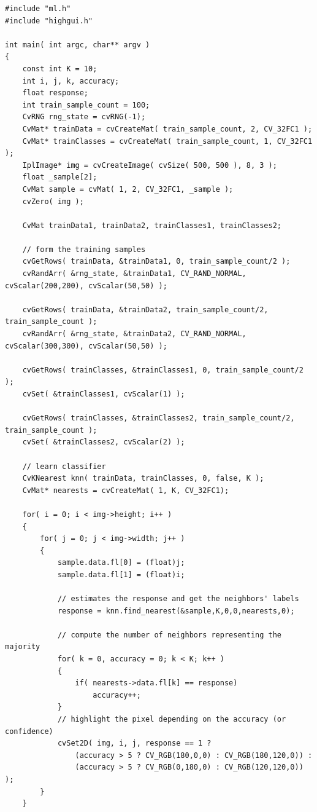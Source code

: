 \begin{lstlisting}
#include "ml.h"
#include "highgui.h"

int main( int argc, char** argv )
{
    const int K = 10;
    int i, j, k, accuracy;
    float response;
    int train_sample_count = 100;
    CvRNG rng_state = cvRNG(-1);
    CvMat* trainData = cvCreateMat( train_sample_count, 2, CV_32FC1 );
    CvMat* trainClasses = cvCreateMat( train_sample_count, 1, CV_32FC1 );
    IplImage* img = cvCreateImage( cvSize( 500, 500 ), 8, 3 );
    float _sample[2];
    CvMat sample = cvMat( 1, 2, CV_32FC1, _sample );
    cvZero( img );

    CvMat trainData1, trainData2, trainClasses1, trainClasses2;

    // form the training samples
    cvGetRows( trainData, &trainData1, 0, train_sample_count/2 );
    cvRandArr( &rng_state, &trainData1, CV_RAND_NORMAL, cvScalar(200,200), cvScalar(50,50) );

    cvGetRows( trainData, &trainData2, train_sample_count/2, train_sample_count );
    cvRandArr( &rng_state, &trainData2, CV_RAND_NORMAL, cvScalar(300,300), cvScalar(50,50) );

    cvGetRows( trainClasses, &trainClasses1, 0, train_sample_count/2 );
    cvSet( &trainClasses1, cvScalar(1) );

    cvGetRows( trainClasses, &trainClasses2, train_sample_count/2, train_sample_count );
    cvSet( &trainClasses2, cvScalar(2) );

    // learn classifier
    CvKNearest knn( trainData, trainClasses, 0, false, K );
    CvMat* nearests = cvCreateMat( 1, K, CV_32FC1);

    for( i = 0; i < img->height; i++ )
    {
        for( j = 0; j < img->width; j++ )
        {
            sample.data.fl[0] = (float)j;
            sample.data.fl[1] = (float)i;

            // estimates the response and get the neighbors' labels
            response = knn.find_nearest(&sample,K,0,0,nearests,0);

            // compute the number of neighbors representing the majority
            for( k = 0, accuracy = 0; k < K; k++ )
            {
                if( nearests->data.fl[k] == response)
                    accuracy++;
            }
            // highlight the pixel depending on the accuracy (or confidence)
            cvSet2D( img, i, j, response == 1 ?
                (accuracy > 5 ? CV_RGB(180,0,0) : CV_RGB(180,120,0)) :
                (accuracy > 5 ? CV_RGB(0,180,0) : CV_RGB(120,120,0)) );
        }
    }


\end{lstlisting}
